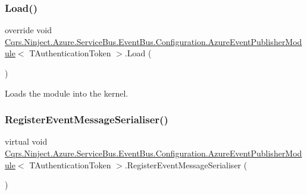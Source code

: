 \subsubsection{\texorpdfstring{Load()}{Load()}}
{\footnotesize\ttfamily override void \hyperlink{classCqrs_1_1Ninject_1_1Azure_1_1ServiceBus_1_1EventBus_1_1Configuration_1_1AzureEventPublisherModule}{Cqrs.\+Ninject.\+Azure.\+Service\+Bus.\+Event\+Bus.\+Configuration.\+Azure\+Event\+Publisher\+Module}$<$ T\+Authentication\+Token $>$.Load (\begin{DoxyParamCaption}{ }\end{DoxyParamCaption})}



Loads the module into the kernel. 

\mbox{\label{classCqrs_1_1Ninject_1_1Azure_1_1ServiceBus_1_1EventBus_1_1Configuration_1_1AzureEventPublisherModule_a083d0a67e9aff92b84b710f1ad3f1e9b_a083d0a67e9aff92b84b710f1ad3f1e9b}} 
\subsubsection{\texorpdfstring{Register\+Event\+Message\+Serialiser()}{RegisterEventMessageSerialiser()}}
{\footnotesize\ttfamily virtual void \hyperlink{classCqrs_1_1Ninject_1_1Azure_1_1ServiceBus_1_1EventBus_1_1Configuration_1_1AzureEventPublisherModule}{Cqrs.\+Ninject.\+Azure.\+Service\+Bus.\+Event\+Bus.\+Configuration.\+Azure\+Event\+Publisher\+Module}$<$ T\+Authentication\+Token $>$.Register\+Event\+Message\+Serialiser (\begin{DoxyParamCaption}{ }\end{DoxyParamCaption})\hspace{0.3cm}{\ttfamily [virtual]}}



